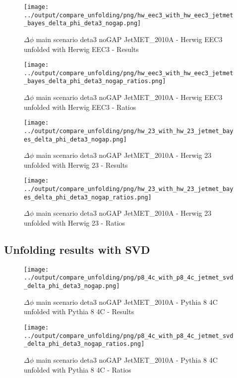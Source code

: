 \documentclass[11pt]{book}
\begin{document}
\begin{figure}[ht]
\centering
\texttt{[image: ../output/compare\_unfolding/png/hw\_eec3\_with\_hw\_eec3\_jetmet\_bayes\_delta\_phi\_deta3\_nogap.png]}
\caption{$\Delta\phi$ main scenario deta3 noGAP JetMET\_2010A - Herwig EEC3 unfolded with Herwig EEC3 - Results}
\label{hw_eec3_hw_eec3_jetmet_bayes_delta_phi_deta3_nogap_a}
\end{figure}

\begin{figure}[ht]
\centering
\texttt{[image: ../output/compare\_unfolding/png/hw\_eec3\_with\_hw\_eec3\_jetmet\_bayes\_delta\_phi\_deta3\_nogap\_ratios.png]}
\caption{$\Delta\phi$ main scenario deta3 noGAP JetMET\_2010A - Herwig EEC3 unfolded with Herwig EEC3 - Ratios}
\label{hw_eec3_hw_eec3_jetmet_bayes_delta_phi_deta3_nogap_b}
\end{figure}

\begin{figure}[ht]
\centering
\texttt{[image: ../output/compare\_unfolding/png/hw\_23\_with\_hw\_23\_jetmet\_bayes\_delta\_phi\_deta3\_nogap.png]}
\caption{$\Delta\phi$ main scenario deta3 noGAP JetMET\_2010A - Herwig 23 unfolded with Herwig 23 - Results}
\label{hw_23_hw_23_jetmet_bayes_delta_phi_deta3_nogap_a}
\end{figure}

\begin{figure}[ht]
\centering
\texttt{[image: ../output/compare\_unfolding/png/hw\_23\_with\_hw\_23\_jetmet\_bayes\_delta\_phi\_deta3\_nogap\_ratios.png]}
\caption{$\Delta\phi$ main scenario deta3 noGAP JetMET\_2010A - Herwig 23 unfolded with Herwig 23 - Ratios}
\label{hw_23_hw_23_jetmet_bayes_delta_phi_deta3_nogap_b}
\end{figure}


\clearpage
\subsection{Unfolding results with SVD}

\begin{figure}[ht]
\centering
\texttt{[image: ../output/compare\_unfolding/png/p8\_4c\_with\_p8\_4c\_jetmet\_svd\_delta\_phi\_deta3\_nogap.png]}
\caption{$\Delta\phi$ main scenario deta3 noGAP JetMET\_2010A - Pythia 8 4C unfolded with Pythia 8 4C - Results}
\label{p8_p8_jetmet_svd_delta_phi_deta3_nogap_a}
\end{figure}

\begin{figure}[ht]
\centering
\texttt{[image: ../output/compare\_unfolding/png/p8\_4c\_with\_p8\_4c\_jetmet\_svd\_delta\_phi\_deta3\_nogap\_ratios.png]}
\caption{$\Delta\phi$ main scenario deta3 noGAP JetMET\_2010A - Pythia 8 4C unfolded with Pythia 8 4C - Ratios}
\label{p8_p8_jetmet_svd_delta_phi_deta3_nogap_b}
\end{figure}
\end{document}
